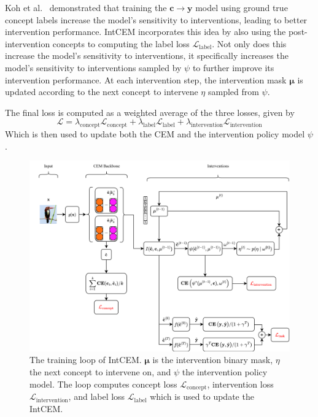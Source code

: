 Koh et al.~\cite{cbm} demonstrated that
training the $\mathbf{c} \to \mathbf{y}$ model using ground
true concept labels increase the model's sensitivity
to interventions,
leading to better intervention performance.
IntCEM incorporates this idea by 
also using 
the post-intervention concepts to
computing the label loss $\mathcal{L}_{\text{label}}$.
Not only does this increase the model's sensitivity to interventions,
it specifically increases the model's sensitivity to interventions
sampled by $\psi$ to further improve its intervention performance. At each intervention step,
the intervention mask $\bm{\mu}$ is updated according to 
the next concept to intervene $\eta$ sampled from $\psi$.

The final loss is computed as a weighted average of the three losses,
given by 
\begin{equation}\label{equation:intcem-loss}
\mathcal{L} = \lambda_{\text{concept}} \mathcal{L}_{\text{concept}}
+  \lambda_{\text{label}} \mathcal{L}_{\text{label}}
+  \lambda_{\text{intervention}} \mathcal{L}_{\text{intervention}}
\end{equation}
Which is then used to update both the CEM and the intervention policy model $\psi$.

\begin{figure}[!ht]
    \centering
    \includegraphics[width=\textwidth]{figs/background/intcem.png}
    \caption{The training loop of IntCEM. $\bm{\mu}$ is the intervention binary mask,
    $\eta$ the next concept to intervene on, and $\psi$ the intervention policy model.
    The loop computes concept loss $\mathcal{L}_{\text{concept}}$,
    intervention loss $\mathcal{L}_{\text{intervention}}$, and label loss $\mathcal{L}_{\text{label}}$ which is used to update the
    IntCEM.}
    \label{fig:intcem}
\end{figure}

